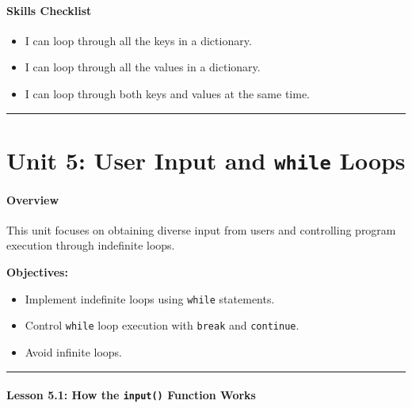 \documentclass[
  justified,
  openright,
]{tufte-book}
\let\subsection\paragraph
\let\paragraph\paragraph
\let\subsection\paragraph
\let\paragraph\paragraph
\providecommand{\tightlist}{%
  \setlength{\itemsep}{0pt}\setlength{\parskip}{0pt}}
\begin{document}
\subsection{Skills Checklist}\label{skills-checklist-21}

\begin{itemize}
\tightlist
\item[$\square$]
  I can loop through all the keys in a dictionary.
\item[$\square$]
  I can loop through all the values in a dictionary.
\item[$\square$]
  I can loop through both keys and values at the same time.
\end{itemize}

\begin{center}\rule{0.5\linewidth}{0.5pt}\end{center}

\section{\texorpdfstring{Unit 5: User Input and \texttt{while}
Loops}{Unit 5: User Input and while Loops}}\label{unit-5-user-input-and-while-loops-1}

\subsection{Overview}\label{overview-5}

This unit focuses on obtaining diverse input from users and controlling
program execution through indefinite loops.

\textbf{Objectives:}

\begin{itemize}
\tightlist
\item
  Implement indefinite loops using \texttt{while} statements.
\item
  Control \texttt{while} loop execution with \texttt{break} and
  \texttt{continue}.
\item
  Avoid infinite loops.
\end{itemize}

\begin{center}\rule{0.5\linewidth}{0.5pt}\end{center}

\subsection{\texorpdfstring{Lesson 5.1: How the \texttt{input()}
Function
Works}{Lesson 5.1: How the input() Function Works}}\label{lesson-5.1-how-the-input-function-works}
\end{document}
